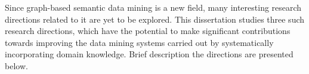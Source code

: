 

Since graph-based semantic data mining is a new field, many interesting research directions related to it are yet to be explored. This dissertation studies three such research directions, which have the potential to make significant contributions towards improving the data mining systems carried out by systematically incorporating domain knowledge. Brief description the directions are presented below.

